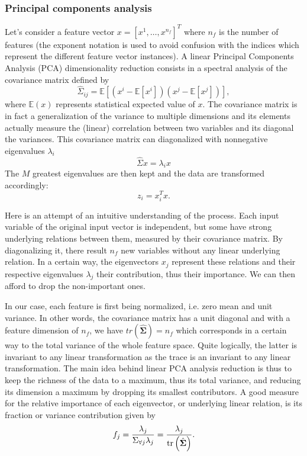 \subsubsection{Principal components analysis}
Let's consider a feature vector $x = \left[x^1,\ldots,x^{n_f} \right]^T$ where $n_f$ is the number of features (the exponent notation is used to avoid confusion with the indices which represent the different feature vector instances). A linear Principal Components Analysis (PCA) dimensionality reduction consists in a spectral analysis of the covariance matrix defined by
\begin{equation}
    \hat{\Sigma}_{ij} = \mathbb{E}\left[\left(x^i - \mathbb{E}[x^i]\right)\left(x^j - \mathbb{E}[x^j]\right)\right],
\end{equation} 
where $\mathbb{E}(x)$ represents statistical expected value of $x$. The covariance matrix is in fact a generalization of the variance to multiple dimensions and its elements actually measure the (linear) correlation between two variables and its diagonal the variances. This covariance matrix can diagonalized with nonnegative eigenvalues $\lambda_i$
\begin{equation}
\hat{\Sigma}x = \lambda_ix
\end{equation}
The $M$ greatest eigenvalues are then kept and the data are transformed accordingly:
\begin{equation}
z_i = x_i^Tx.
\end{equation}

Here is an attempt of an intuitive understanding of the process. Each input variable of the original input vector is independent, but some have strong underlying relations between them, measured by their covariance matrix. By diagonalizing it, there result $n_f$ new variables without any linear underlying relation. In a certain way, the eigenvectors $x_j$ represent these relations and their respective eigenvalues $\lambda_j$ their contribution, thus their importance. We can then afford to drop the non-important ones.

In our case, each feature is first being normalized, i.e. zero mean and unit variance. In other words, the covariance matrix has a unit diagonal and with a feature dimension of $n_f$, we have $tr(\hat{\mathbf{\Sigma}})=n_f$ which corresponds in a certain way to the total variance of the whole feature space. Quite logically, the latter is invariant to any linear transformation as the trace is an invariant to any linear transformation. The main idea behind linear PCA analysis reduction is thus to keep the richness of the data to a maximum, thus its total variance, and reducing its dimension a maximum by dropping its smallest contributors. A good measure for the relative importance of each eigenvector, or underlying linear relation, is its fraction or variance contribution given by
\begin{equation}
f_j = \frac{\lambda_j}{\Sigma_{\forall j}\lambda_j} = \frac{\lambda_j}{\operatorname{tr}\left(\hat{\mathbf{\Sigma}}\right)}.
\end{equation}

